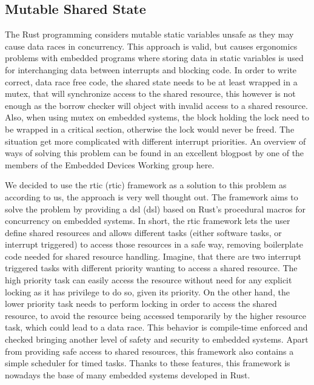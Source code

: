 \subsection{Mutable Shared State}
\label{subsec:mut_shared_state}
The Rust programming considers mutable static variables unsafe as they may cause data races in concurrency\cite{noauthor_static_nodate}.
This approach is valid, but causes ergonomics problems with embedded programs where storing data in static variables is used for interchanging data between interrupts and blocking code.
In order to write correct, data race free code, the shared state needs to be at least wrapped in a mutex, that will synchronize access to the shared resource, this however is not enough as the borrow checker will object with invalid access to a shared resource.
Also, when using mutex on embedded systems, the block holding the lock need to be wrapped in a critical section, otherwise the lock would never be freed.
The situation get more complicated with different interrupt priorities.
An overview of ways of solving this problem can be found in an excellent blogpost by one of the members of the Embedded Devices Working group here\cite{egger_look_nodate}.

We decided to use the \acs{rtic} (\acl{rtic}) framework\cite{noauthor_preface_nodate} as a solution to this problem as according to us, the approach is very well thought out.
The framework aims to solve the problem by providing a \acs{dsl} (\acl{dsl}) based on Rust's procedural macros for concurrency on embedded systems.
In short, the \acs{rtic} framework lets the user define shared resources and allows different tasks (either software tasks, or interrupt triggered) to access those resources in a safe way, removing boilerplate code needed for shared resource handling.
Imagine, that there are two interrupt triggered tasks with different priority wanting to access a shared resource.
The high priority task can easily access the resource without need for any explicit locking as it has privilege to do so, given its priority.
On the other hand, the lower priority task needs to perform locking in order to access the shared resource, to avoid the resource being accessed temporarily by the higher resource task, which could lead to a data race.
This behavior is compile-time enforced and checked bringing another level of safety and security to embedded systems.
Apart from providing safe access to shared resources, this framework also contains a simple scheduler for timed tasks.
Thanks to these features, this framework is nowadays the base of many embedded systems developed in Rust.

